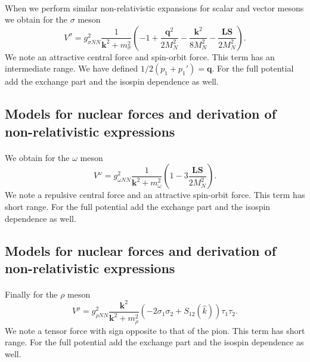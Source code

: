 \documentclass[%
twoside,                 %
final,                   %
10pt]{article}
\begin{document}
\paragraph{}
When we perform similar non-relativistic expansions for scalar and vector mesons we obtain
for the $\sigma$ meson
\[
V^{\sigma}= g_{\sigma NN}^{2}\frac{1}{\mathbf{k}^{2}+m_{\sigma}^{2}}\left (-1+\frac{\mathbf{q}^{2}}{2M_N^2}
-\frac{\mathbf{k}^{2}}{8M_N^2}-\frac{\mathbf{LS}}{2M_N^2}\right).
\]
We note an attractive central force and spin-orbit force. This term has an intermediate range.
We have defined $1/2(p_{1}+p_{1}')=\mathbf{q}$.
For the full potential add the exchange part and the isospin dependence as well.



\subsection*{Models for nuclear forces and derivation of non-relativistic expressions}

\paragraph{}
We obtain
for the $\omega$ meson
\[
V^{\omega}= g_{\omega NN}^{2}\frac{1}{\mathbf{k}^{2}+m_{\omega}^{2}}\left (1-3\frac{\mathbf{LS}}{2M_N^2}\right).
\]
We note a repulsive central force and an attractive spin-orbit force. This term has  short range.
For the full potential add the exchange part and the isospin dependence as well.



\subsection*{Models for nuclear forces and derivation of non-relativistic expressions}

\paragraph{}
Finally 
for the $\rho$ meson
\[
V^{\rho}= g_{\rho NN}^{2}\frac{\mathbf{k}^{2}}{\mathbf{k}^{2}+m_{\rho}^{2}}\left (
-2\sigma_{1}\sigma_{2}+S_{12}(\hat{k})\right)\tau_{1}\tau_{2}.
\]
We note a tensor force with sign opposite to that of the pion. This term has  short range. For the full potential add the exchange part and the isospin dependence as well.
\end{document}
